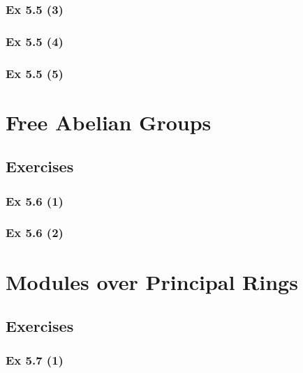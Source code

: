 \subsubsection{Ex 5.5 (3)}\label{sec:Ex_5.5.3}

\subsubsection{Ex 5.5 (4)}\label{sec:Ex_5.5.4}

\subsubsection{Ex 5.5 (5)}\label{sec:Ex_5.5.5}

\newpage		%

\section{Free Abelian Groups}\label{sec:5.6}
\subsection{Exercises}\label{sec:5.6_Exercises}

\subsubsection{Ex 5.6 (1)}\label{sec:Ex_5.6.1}

\subsubsection{Ex 5.6 (2)}\label{sec:Ex_5.6.2}


\newpage		%

\section{Modules over Principal Rings}\label{sec:5.7}
\subsection{Exercises}\label{sec:5.7_Exercises}

\subsubsection{Ex 5.7 (1)}\label{sec:Ex_5.7.1}

